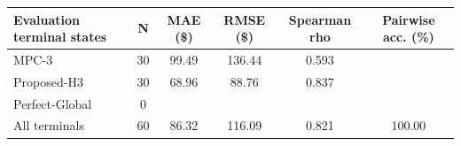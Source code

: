 \begin{tabular}{lccccc}
\toprule
Evaluation terminal states & N & MAE (\$) & RMSE (\$) & Spearman rho & Pairwise acc. (\%) \\
\midrule
MPC-3 & 30 & 99.49 & 136.44 & 0.593 &  \\
Proposed-H3 & 30 & 68.96 & 88.76 & 0.837 &  \\
Perfect-Global & 0 &  &  &  &  \\
All terminals & 60 & 86.32 & 116.09 & 0.821 & 100.00 \\
\bottomrule
\end{tabular}
